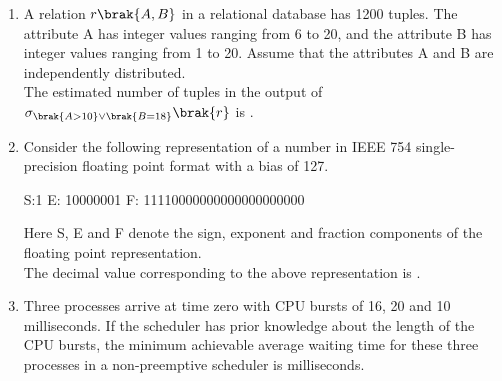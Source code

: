\documentclass[a4paper, 11pt]{article}
\begin{document}
\begin{enumerate}
    \item A relation $r\brak{A,B}$ in a relational database has 1200 tuples. The attribute A has integer values ranging from 6 to 20, and the attribute B has integer values ranging from 1 to 20. Assume that the attributes A and B are independently distributed.\\The estimated number of tuples in the output of $\sigma_{\brak{A>10} \lor \brak{B=18}}\brak{r}$ is \underline{\hspace{2cm}}.
    \hfill{}
    \item Consider the following representation of a number in IEEE 754 single-precision floating point format with a bias of 127.
    \begin{center}   
    S:1 E: 10000001 F: 11110000000000000000000
    \end{center}
    Here S, E and F denote the sign, exponent and fraction components of the floating point representation.\\
    The decimal value corresponding to the above representation  is \underline{\hspace{2cm}}.
    \hfill{}
    
    \item Three processes arrive at time zero with CPU bursts of 16, 20 and 10 milliseconds. If the scheduler has prior knowledge about the length of the CPU bursts, the minimum achievable average waiting time for these three processes in a non-preemptive scheduler  is \underline{\hspace{2cm}} milliseconds.
    
    \hfill{}
    

\end{enumerate}
\end{document}
